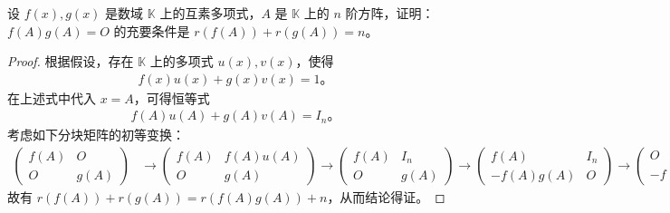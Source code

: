 \documentclass[lang=cn,newtx,10pt,scheme=chinese]{elegantbook}
\begin{document}
\begin{proposition}
设 $f(x), g(x)$ 是数域 $\mathbb{K}$ 上的互素多项式，$A$ 是 $\mathbb{K}$ 上的 $n$ 阶方阵，证明：$f(A)g(A) = O$ 的充要条件是 $r(f(A)) + r(g(A)) = n$。
\end{proposition}
\begin{proof}
根据假设，存在 $\mathbb{K}$ 上的多项式 $u(x), v(x)$，使得
\begin{align*}
f(x)u(x) + g(x)v(x) = 1。
\end{align*}
在上述式中代入 $x = A$，可得恒等式
\begin{align*}
f(A)u(A) + g(A)v(A) = I_n。
\end{align*}
考虑如下分块矩阵的初等变换：
\begin{align*}
\begin{pmatrix}
f(A) & O \\
O & g(A)
\end{pmatrix}
&\to
\begin{pmatrix}
f(A) & f(A)u(A) \\
O & g(A)
\end{pmatrix}
\to
\begin{pmatrix}
f(A) & I_n \\
O & g(A)
\end{pmatrix}
\to
\begin{pmatrix}
f(A) & I_n \\
-f(A)g(A) & O
\end{pmatrix}
\to
\begin{pmatrix}
O & I_n \\
-f(A)g(A) & O
\end{pmatrix},
\end{align*}
故有 $r(f(A)) + r(g(A)) = r(f(A)g(A)) + n$，从而结论得证。
\end{proof}
\end{document}
